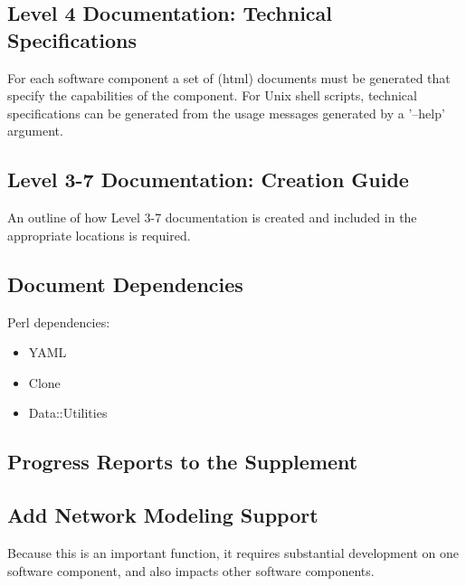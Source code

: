 \documentclass[12pt]{article}
\begin{document}
\subsection{Level 4 Documentation: Technical Specifications}

For each software component a set of (html) documents must be
generated that specify the capabilities of the component.  For Unix
shell scripts, technical specifications can be generated from the
usage messages generated by a '--help' argument.

\subsection{Level 3-7 Documentation: Creation Guide}

An outline of how Level 3-7 documentation is created and included in
the appropriate locations is required.


\subsection{Document Dependencies}

Perl dependencies:
\begin{itemize}
\item YAML
\item Clone
\item Data::Utilities
\end{itemize}


\subsection{Progress Reports to the Supplement}


\subsection{Add Network Modeling Support}

Because this is an important function, it requires substantial
development on one software component, and also impacts other software
components.
\end{document}
